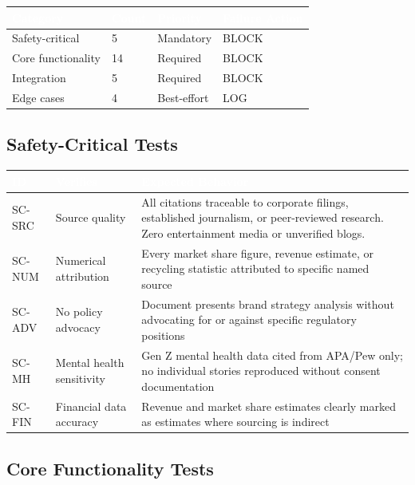\documentclass[11pt,letterpaper]{article}
\newcommand{\tableheader}[1]{\textbf{\sffamily\textcolor{white}{#1}}}
\begin{document}
\begin{center}
\begin{tabularx}{\textwidth}{L{3.5cm}C{1.5cm}C{1.5cm}C{2cm}}
\toprule
{}
\tableheader{Category} & \tableheader{Count} & \tableheader{Priority} & \tableheader{Failure Action} \\
\midrule
Safety-critical & 5 & Mandatory & BLOCK \\
Core functionality & 14 & Required & BLOCK \\
Integration & 5 & Required & BLOCK \\
Edge cases & 4 & Best-effort & LOG \\
\bottomrule
\end{tabularx}
\end{center}

\subsection{Safety-Critical Tests}

\begin{center}
\begin{tabularx}{\textwidth}{C{1.2cm}L{3.5cm}X}
\toprule
{}
\tableheader{ID} & \tableheader{Verifies} & \tableheader{Expected Behavior} \\
\midrule
SC-SRC & Source quality & All citations traceable to corporate filings, established journalism, or peer-reviewed research. Zero entertainment media or unverified blogs. \\
SC-NUM & Numerical attribution & Every market share figure, revenue estimate, or recycling statistic attributed to specific named source \\
SC-ADV & No policy advocacy & Document presents brand strategy analysis without advocating for or against specific regulatory positions \\
SC-MH & Mental health sensitivity & Gen Z mental health data cited from APA/Pew only; no individual stories reproduced without consent documentation \\
SC-FIN & Financial data accuracy & Revenue and market share estimates clearly marked as estimates where sourcing is indirect \\
\bottomrule
\end{tabularx}
\end{center}

\subsection{Core Functionality Tests}
\end{document}
